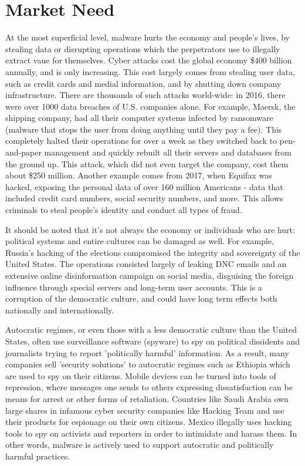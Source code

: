\documentclass[openright]{report}
\begin{document}
\section{Market Need}

\par At the most superficial level, malware hurts the economy and people's lives, by stealing data or disrupting operations which the perpetrators use to illegally extract vaue for themselves. Cyber attacks cost the global economy \$400 billion annually, and is only increasing\cite{cyber_cost}. This cost largely comes from stealing user data, such as credit cards and medial information, and by shutting down company infrastructure. There are thousands of such attacks world-wide: in 2016, there were over 1000 data breaches of U.S. companies alone. For example, Maersk, the shipping company, had all their computer systems infected by ransomware (malware that stops the user from doing anything until they pay a fee). This completely halted their operations for over a week as they switched back to pen-and-paper management and quickly rebuilt all their servers and databases from the ground up. This attack, which did not even target the company, cost them about \$250 million\cite{maersk}. Another example comes from 2017, when Equifax was hacked, exposing the personal data of over 160 million Americans - data that included credit card numbers, social security numbers, and more. This allows criminals to steal people's identity and conduct all types of fraud.

\par It should be noted that it's not always the economy or individuals who are hurt: political systems and entire cultures can be damaged as well. For example, Russia's hacking of the elections compromised the integrity and sovereignty of the United States\cite{russa_indicement}. The operations consisted largely of leaking DNC emails and an extensive online disinformation campaign on social media, disguising the foreign influence through special servers and long-term user accounts\cite{russa_indicement_nyt}\cite{what_russia_did}. This is a corruption of the democratic culture, and could have long term effects both nationally and internationally. 

\par Autocratic regimes, or even those with a less democratic culture than the United States, often use surveillance software (spyware) to spy on political dissidents and journalists trying to report 'politically harmful' information. As a result, many companies sell 'security solutions' to autocratic regimes such as Ethiopia which are used to spy on their citizens\cite{ethiopia_surveillance}. Mobile devices can be turned into tools of repression, where messages one sends to others expressing dissatisfaction can be means for arrest or other forms of retaliation. Countries like Saudi Arabia own large shares in infamous cyber security companies like Hacking Team and use their products for espionage on their own citizens\cite{saudi_cyber}. Mexico illegally uses hacking tools to spy on activists and reporters in order to intimidate and harass them\cite{mexico_cyber}. In other words, malware is actively used to support autocratic and politically harmful practices.
\end{document}
